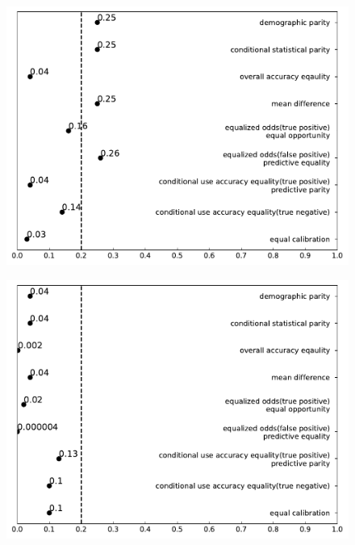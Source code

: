 \documentclass[conference]{IEEEtran}
\begin{document}
\begin{figure}[h]
    \centering
    \begin{minipage}[b]{0.48\linewidth}
        \centering
        \includegraphics[width=\linewidth]{Non-Less than 25}
        \label{fig:1}
    \end{minipage}
    \hfill
    \begin{minipage}[b]{0.48\linewidth}
        \centering
        \includegraphics[width=\linewidth]{Male}
        \label{fig:2}
    \end{minipage}
    \hfill
    \begin{minipage}[b]{0.48\linewidth}

\end{minipage}
\end{figure}
\end{document}
